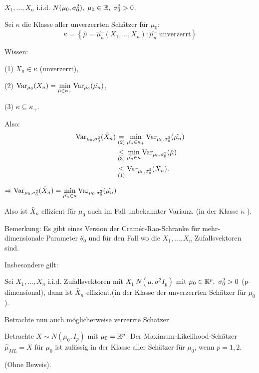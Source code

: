 \documentclass{tstextbook}
\begin{document}
\begin{example}
	$ X_1,\ldots,X_n $ i.i.d. $ N(\mu_0,\sigma_0^2), \; \mu_0 \in \mathbb R, \; \sigma_0^2 > 0 $.
	
	Sei $ \kappa $ die Klasse aller unverzerrten Schätzer für $ \mu_0 $:
	\[
	\kappa = \left\lbrace \hat{\mu} = \hat{\mu_n}(X_1,\ldots,X_n) \colon \hat{\mu_n} \text{ unverzerrt}\right\rbrace
	\]
	
	Wissen: 
	
	(1) $ \bar{X}_n \in \kappa $ (unverzerrt),
	
	(2) $ \operatorname{Var}_{\mu_0}(\bar{X}_n) = \underset{\hat{\mu}\in\kappa_+}{\min}\operatorname{Var}_{\mu_0}(\hat{\mu_n}) $,
	
	(3) $ \kappa \subseteq \kappa_+ $. 
	
	Also: 
	\[
	\begin{aligned}
		\operatorname{Var}_{\mu_0,\sigma_0^2}(\bar{X}_n) & \underset{(2)}{=} \underset{\hat{\mu_n}\in\kappa_+}{\min}\operatorname{Var}_{\mu_0, \sigma_0^2}(\hat{\mu_n}) \\
		& \underset{(3)}{\le} \underset{\hat{\mu_n}\in\kappa}{\min}\operatorname{Var}_{\mu_0,\sigma_0^2}(\hat{\mu}) \\
		& \underset{(1)}{\le} \operatorname{Var}_{\mu_0,\sigma_0^2}(\bar{X}_n).
	\end{aligned}
	\]
	
	$ \Rightarrow \operatorname{Var}_{\mu_0,\sigma_0^2}(\bar{X}_n) = \underset{\hat{\mu_n}\in\kappa}{\min}\operatorname{Var}_{\mu_0,\sigma_0^2}(\hat{\mu_n}) $
	
	Also ist $ \bar{X}_n $ effizient  für $ \mu_0 $ auch im Fall unbekannter Varianz.  (in der Klasse $\kappa$ ).
\end{example}

\begin{remark}
	Bemerkung:
	Es gibt eines Version der Cramér-Rao-Schranke für mehr-dimensionale Parameter $\theta_0 $ und für den Fall wo die $X_1, ... ,X_n$ Zufallsvektoren sind. 
	
	Insbesondere gilt: 
	
	Sei $ X_1,\ldots,X_n $ i.i.d. Zufallsvektoren mit $ X_1 ~ N(\mu,\sigma^2 I_p) $ mit $ \mu_0 \in \mathbb R^p, \ \sigma_0 ^2 > 0 $ (p-dimensional), dann ist $ \bar{X}_n $  effizient.(in der Klasse der unverzerrten Schätzer für $\mu_0$).
\end{remark}

Betrachte nun auch möglicherweise verzerrte Schätzer.

\begin{theorem}
	Betrachte $ X\sim N(\mu_0,I_p) $ mit $ \mu_0 = \mathbb R^p $. Der Maximum-Likelihood-Schätzer $ \hat{\mu}_{ML} = X $ für $ \mu_0 $ ist zulässig in der Klasse aller Schätzer für $ \mu_0 $, wenn $ p=1,2. $
\end{theorem}
(Ohne Beweis). 
\end{document}
